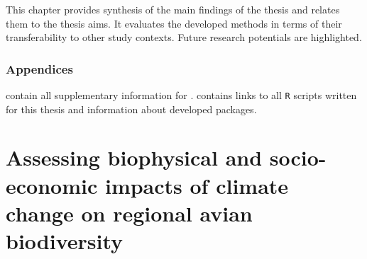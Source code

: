 \documentclass[titlesmallcaps,copyrightpage]{uomthesis}\usepackage[]{graphicx}\usepackage[]{color}
\begin{document}
This chapter provides synthesis of the main findings of the thesis and relates them to the thesis aims. It evaluates the developed methods in terms of their transferability to other study contexts. Future research potentials are highlighted.

\subsection*{Appendices}

 contain all supplementary information for .  contains links to all \texttt{R} scripts written for this thesis and information about developed packages.

\chapter{Assessing biophysical and socio-economic impacts of climate change on regional avian biodiversity}\label{ch2}
\newpage
\end{document}
